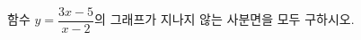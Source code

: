 \hspace*{2mm}\begin{minipage}[t]{\dimexpr\linewidth-2mm\relax}\vspace{0pt}
함수 $y=\dfrac{3x-5}{x-2}$의 그래프가 지나지 않는 사분면을 모두 구하시오.\end{minipage}
